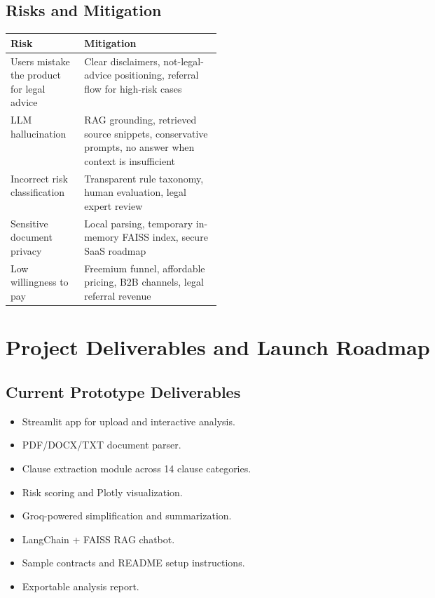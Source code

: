 \documentclass[11pt,a4paper]{article}
\begin{document}
\subsection{Risks and Mitigation}

\begin{tabularx}{\linewidth}{L{0.35\linewidth}Y}
\toprule
\textbf{Risk} & \textbf{Mitigation} \\
\midrule
Users mistake the product for legal advice & Clear disclaimers, not-legal-advice positioning, referral flow for high-risk cases \\
LLM hallucination & RAG grounding, retrieved source snippets, conservative prompts, no answer when context is insufficient \\
Incorrect risk classification & Transparent rule taxonomy, human evaluation, legal expert review \\
Sensitive document privacy & Local parsing, temporary in-memory FAISS index, secure SaaS roadmap \\
Low willingness to pay & Freemium funnel, affordable pricing, B2B channels, legal referral revenue \\
\bottomrule
\end{tabularx}

\section{Project Deliverables and Launch Roadmap}

\subsection{Current Prototype Deliverables}

\begin{itemize}
\item Streamlit app for upload and interactive analysis.
\item PDF/DOCX/TXT document parser.
\item Clause extraction module across 14 clause categories.
\item Risk scoring and Plotly visualization.
\item Groq-powered simplification and summarization.
\item LangChain + FAISS RAG chatbot.
\item Sample contracts and README setup instructions.
\item Exportable analysis report.
\end{itemize}
\end{document}
